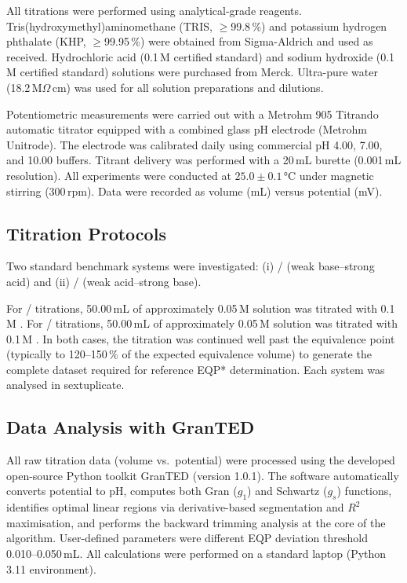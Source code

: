 \documentclass[twoside,twocolumn,9pt]{article}
\begin{document}
All titrations were performed using analytical-grade reagents.
Tris(hydroxymethyl)aminomethane (TRIS, $\geq$99.8\,\%) and potassium hydrogen phthalate (KHP, $\geq$99.95\,\%) were obtained from Sigma-Aldrich and used as received.
Hydrochloric acid (0.1\,M certified standard) and sodium hydroxide (0.1\,M certified standard) solutions were purchased from Merck.
Ultra-pure water (18.2\,M$\Omega$\,cm) was used for all solution preparations and dilutions.

Potentiometric measurements were carried out with a Metrohm 905 Titrando automatic titrator equipped with a combined glass pH electrode (Metrohm Unitrode).
The electrode was calibrated daily using commercial pH 4.00, 7.00, and 10.00 buffers.
Titrant delivery was performed with a 20\,mL burette (0.001\,mL resolution).
All experiments were conducted at $25.0 \pm 0.1$\,°C under magnetic stirring (300\,rpm).
Data were recorded as volume (mL) versus potential (mV).

\subsection*{Titration Protocols}

Two standard benchmark systems were investigated: (i) / (weak base–strong acid) and (ii) / (weak acid–strong base).

For / titrations, 50.00\,mL of approximately 0.05\,M  solution was titrated with 0.1\,M .
For / titrations, 50.00\,mL of approximately 0.05\,M  solution was titrated with 0.1\,M .
In both cases, the titration was continued well past the equivalence point (typically to 120–150\,\% of the expected equivalence volume) to generate the complete dataset required for reference EQP* determination. Each system was analysed in sextuplicate.

\subsection*{Data Analysis with GranTED}

All raw titration data (volume vs.\ potential) were processed using the developed open-source Python toolkit \textsf{GranTED} (version 1.0.1). The software automatically converts potential to pH, computes both Gran (\(g_1\)) and Schwartz (\(g_s\)) functions, identifies optimal linear regions via derivative-based segmentation and $R^2$ maximisation, and performs the backward trimming analysis at the core of the algorithm. User-defined parameters were different EQP deviation threshold 0.010--0.050\,mL. All calculations were performed on a standard laptop (Python 3.11 environment).
\end{document}
